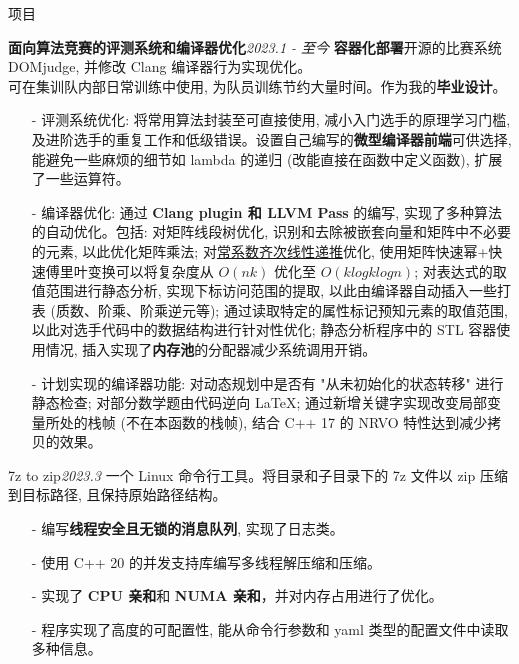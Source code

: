 \documentclass{resume} %
\begin{document}
\begin{rSection}{项目}

\begin{rSubsection}
    {\textbf{面向算法竞赛的评测系统和编译器优化}}{\em 2023.1 - 至今}
    {\textbf{容器化部署}开源的比赛系统 DOMjudge, 并修改 Clang 编译器行为实现优化。\\}
    {可在集训队内部日常训练中使用, 为队员训练节约大量时间。作为我的\textbf{毕业设计}。}
    \item[]
    \begin{itemize}
        \setlength\itemsep{-0.5em}
        \item[-] 评测系统优化: 将常用算法封装至可直接使用, 减小入门选手的原理学习门槛, 及进阶选手的重复工作和低级错误。设置自己编写的\textbf{微型编译器前端}可供选择, 能避免一些麻烦的细节如 lambda 的递归 (改能直接在函数中定义函数), 扩展了一些运算符。
        \item[-] 编译器优化: 通过 \textbf{Clang plugin 和 LLVM Pass} 的编写, 实现了多种算法的自动优化。包括: 对矩阵线段树优化, 识别和去除被嵌套向量和矩阵中不必要的元素, 以此优化矩阵乘法; 对\href{https://oi-wiki.org/math/poly/linear-recurrence/}{常系数齐次线性递推}优化, 使用矩阵快速幂+快速傅里叶变换可以将复杂度从 $O(nk)$ 优化至 $O(klogklogn)$; 对表达式的取值范围进行静态分析, 实现下标访问范围的提取, 以此由编译器自动插入一些打表 (质数、阶乘、阶乘逆元等); 通过读取特定的属性标记预知元素的取值范围, 以此对选手代码中的数据结构进行针对性优化; 静态分析程序中的 STL 容器使用情况, 插入实现了\textbf{内存池}的分配器减少系统调用开销。
        \item[-] 计划实现的编译器功能: 对动态规划中是否有 "从未初始化的状态转移" 进行静态检查; 对部分数学题由代码逆向 \LaTeX; 通过新增关键字实现改变局部变量所处的栈帧 (不在本函数的栈帧), 结合 C++ 17 的 NRVO 特性达到减少拷贝的效果。
    \end{itemize}
\end{rSubsection}

\begin{rSubsection}
	{7z to zip}{\em 2023.3}
	{一个 Linux 命令行工具。将目录和子目录下的 7z 文件以 zip 压缩到目标路径, 且保持原始路径结构。}
	{}
	\item[]
	\begin{itemize}
		\setlength\itemsep{-0.5em}
		\item[-] 编写\textbf{线程安全且无锁的消息队列}, 实现了日志类。
		\item[-] 使用 C++ 20 的并发支持库编写多线程解压缩和压缩。
		\item[-] 实现了 \textbf{CPU 亲和}和 \textbf{NUMA 亲和}，并对内存占用进行了优化。
		\item[-] 程序实现了高度的可配置性, 能从命令行参数和 yaml 类型的配置文件中读取多种信息。
	\end{itemize}
\end{rSubsection}


\end{rSection}
\end{document}
